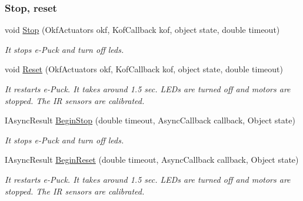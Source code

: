 \subsubsection*{Stop, reset} %
\label{ssub:Stop and reset}
  \begin{DoxyCompactItemize}

  \item void \hyperlink{class_elib_1_1_epuck_a6c5b0e61b183ae36e78251e51e32bdd3}{Stop} (OkfActuators okf, KofCallback kof, object state, double timeout)
  \begin{DoxyCompactList}\small\item\em It stops e-\/Puck and turn off leds. \item\end{DoxyCompactList}

  \item void \hyperlink{class_elib_1_1_epuck_a36714362701622796cf01480ea4f8d32}{Reset} (OkfActuators okf, KofCallback kof, object state, double timeout)
  \begin{DoxyCompactList}\small\item\em It restarts e-\/Puck. It takes around 1.5 sec. LEDs are turned off and motors are stopped. The IR sensors are calibrated. \item\end{DoxyCompactList}

  \item   IAsyncResult \hyperlink{class_elib_1_1_epuck_a4b66f73064942aa5736dca815a427d01}{BeginStop} (double timeout, AsyncCallback callback, Object state)
  \begin{DoxyCompactList}\small\item\em It stops e-\/Puck and turn off leds. \item\end{DoxyCompactList}

  \item   IAsyncResult \hyperlink{class_elib_1_1_epuck_a2b73b814db861ed276587db2fc124244}{BeginReset} (double timeout, AsyncCallback callback, Object state)
  \begin{DoxyCompactList}\small\item\em It restarts e-\/Puck. It takes around 1.5 sec. LEDs are turned off and motors are stopped.  The IR sensors are calibrated.\item\end{DoxyCompactList} 

  \end{DoxyCompactItemize}

